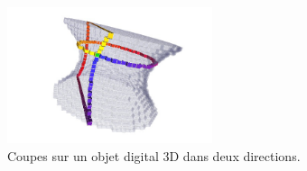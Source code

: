 \begin{figure}[ht]
    \begin{center}
      \includegraphics[width=6cm]{images/Curvature/ctopo3dSurfelCut}
    \end{center}
    \caption[Coupes sur un objet digital 3D.]{Coupes sur un objet digital 3D dans deux directions.}
    \label{fig:3d-dig-object-slices}
\end{figure}

